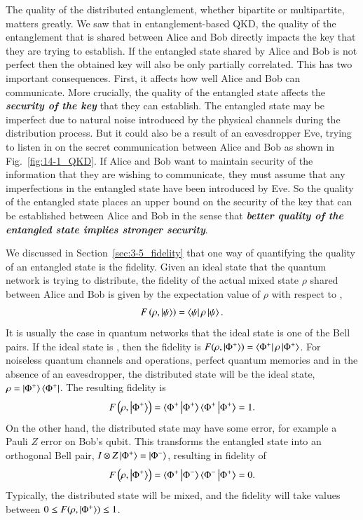 The quality of the distributed entanglement, whether bipartite or multipartite, matters greatly.
We saw that in entanglement-based QKD, the quality of the entanglement that is shared between Alice and Bob directly impacts the key that they are trying to establish.
If the entangled state shared by Alice and Bob is not perfect then the obtained key will also be only partially correlated.
This has two important consequences.
First, it affects how well Alice and Bob can communicate.
More crucially, the quality of the entangled state affects the \emph{\textbf{security of the key}} that they can establish.
The entangled state may be imperfect due to natural noise introduced by the physical channels during the distribution process.
But it could also be a result of an eavesdropper Eve, trying to listen in on the secret communication between Alice and Bob as shown in Fig.~\ref{fig:14-1_QKD}.
If Alice and Bob want to maintain security of the information that they are wishing to communicate, they must assume that any imperfections in the entangled state have been introduced by Eve.
So the quality of the entangled state places an upper bound on the security of the key that can be established between Alice and Bob in the sense that \emph{\textbf{better quality of the entangled state implies stronger security}}.

We discussed in Section~\ref{sec:3-5_fidelity} that one way of quantifying the quality of an entangled state is the fidelity.
Given an ideal state \ket{\psi} that the quantum network is trying to distribute, the fidelity of the actual mixed state $\rho$ shared between Alice and Bob is given by the expectation value of $\rho$ with respect to \ket{\psi},
\begin{equation}
    F \left( \rho, \left| \psi \right\rangle \right) = \left\langle \psi \right|\rho\left| \psi \right\rangle.
\end{equation}
It is usually the case in quantum networks that the ideal state is one of the Bell pairs.
If the ideal state is \ket{\Phi^+}, then the fidelity is $F (\rho, \left| \Phi^+ \right\rangle) = \left\langle \Phi^+ \right|\rho\left| \Phi^+ \right\rangle$.
For noiseless quantum channels and operations, perfect quantum memories and in the absence of an eavesdropper, the distributed state will be the ideal state, $\rho = \left| \Phi^+ \right\rangle\left\langle \Phi^+ \right|$.
The resulting fidelity is
\begin{equation}
    F \left( \rho, \left| \Phi^+ \right\rangle \right) = \langle\Phi^+\left| \Phi^+ \right\rangle \langle\Phi^+\left| \Phi^+ \right\rangle = 1.
\end{equation}
On the other hand, the distributed state may have some error, for example a Pauli $Z$ error on Bob's qubit.
This transforms the entangled state into an orthogonal Bell pair, $I \otimes Z \left| \Phi^+ \right\rangle = \left| \Phi^- \right\rangle$, resulting in fidelity of
\begin{equation}
    F \left( \rho, \ket{\Phi^+} \right) = \langle\Phi^+\ket{\Phi^-} \langle\Phi^-\ket{\Phi^+} = 0.
    \label{eq:14-1_fidelity_0}
\end{equation}
Typically, the distributed state will be mixed, and the fidelity will take values between $ 0 \leq F(\rho, \left| \Phi^+ \right\rangle) \leq 1$.

